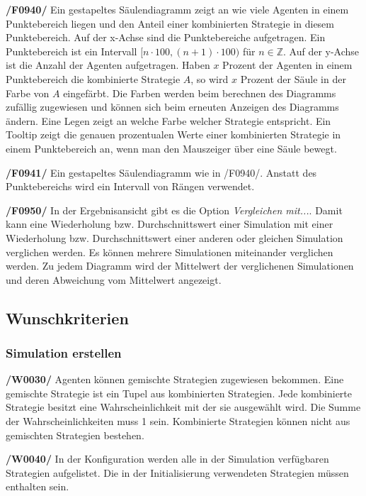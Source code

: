 \textbf{/F0940/}
Ein gestapeltes Säulendiagramm zeigt an wie viele Agenten in einem Punktebereich liegen und den Anteil einer kombinierten Strategie in diesem Punktebereich. {\color{red} Auf der x-Achse sind die Punktebereiche aufgetragen. Ein Punktebereich ist ein Intervall $[n \cdot 100, (n+1) \cdot 100)$ für $n \in \mathbb{Z}$. Auf der y-Achse ist die Anzahl der Agenten aufgetragen. Haben $x$ Prozent der Agenten in einem Punktebereich die kombinierte Strategie $A$, so wird $x$ Prozent der Säule in der Farbe von $A$ eingefärbt. Die Farben werden beim berechnen des Diagramms zufällig zugewiesen und können sich beim erneuten Anzeigen des Diagramms ändern. Eine Legen zeigt an welche Farbe welcher Strategie entspricht. Ein Tooltip zeigt die genauen prozentualen Werte einer kombinierten Strategie in einem Punktebereich an, wenn man den Mauszeiger über eine Säule bewegt.}

{\color{red}\textbf{/F0941/}
Ein gestapeltes Säulendiagramm wie in /F0940/. Anstatt des Punktebereichs wird ein Intervall von Rängen verwendet.}

\textbf{/F0950/}
In der Ergebnisansicht gibt es die Option \emph{Vergleichen mit...}. Damit kann eine Wiederholung bzw. Durchschnittswert einer Simulation mit einer Wiederholung bzw. Durchschnittswert einer anderen oder gleichen Simulation verglichen werden. {\color{red} Es können mehrere Simulationen miteinander verglichen werden. Zu jedem Diagramm wird der Mittelwert der verglichenen Simulationen und deren Abweichung vom Mittelwert angezeigt.}

\subsection{Wunschkriterien}

\subsubsection{Simulation erstellen}

\textbf{/W0030/}
Agenten können gemischte Strategien zugewiesen bekommen. {\color{red} Eine gemischte Strategie ist ein Tupel  aus kombinierten Strategien. Jede kombinierte Strategie besitzt eine Wahrscheinlichkeit mit der sie ausgewählt wird. Die Summe der Wahrscheinlichkeiten muss 1 sein. Kombinierte Strategien können nicht aus gemischten Strategien bestehen.}

\textbf{/W0040/}
In der Konfiguration werden alle in der Simulation verfügbaren Strategien aufgelistet. Die in der Initialisierung verwendeten Strategien müssen enthalten sein.


